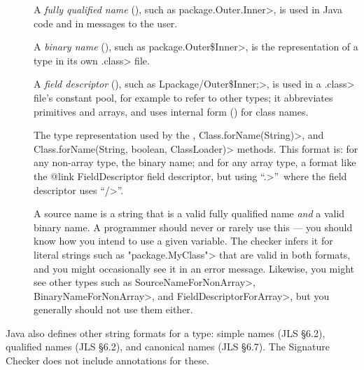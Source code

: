 \begin{description}

\item[]
  A \emph{fully qualified name} (), such as
  \<package.Outer.Inner>, is used in Java code and in messages to
  the user.

\item[]
  A \emph{binary name} (), such as
  \<package.Outer\$Inner>, is
  the representation of a type in its own \<.class> file.

\item[]
  A \emph{field descriptor} (), such as
  \<Lpackage/Outer\$Inner;>, is used in a \<.class> file's constant pool,
  for example to refer to other types; it abbreviates primitives and
  arrays, and uses internal form () for class names.

\item[]
  The type representation used by the
  , \<Class.forName(String)>,
  and \<Class.forName(String, boolean, ClassLoader)> methods.  This format
  is:  for any non-array type, the binary name; and for any array type, a
  format like the {@link FieldDescriptor field descriptor}, but using
  ``\<.>''~where the field descriptor uses ``\</>''.

\item[]
  A source name is a string that is a valid fully qualified name \emph{and}
  a valid binary name.  A programmer should never or rarely use this --- you should
  know how you intend to use a given variable.  The checker infers it for
  literal strings such as \<"package.MyClass"> that are valid in both
  formats, and you might occasionally see it in an error message.
  Likewise, you might see other types such as \<SourceNameForNonArray>,
  \<BinaryNameForNonArray>, and \<FieldDescriptorForArray>, but you
  generally should not use them either.

\end{description}

Java also defines other string formats for a type: simple
names (JLS \S 6.2), qualified names (JLS \S 6.2), and canonical
names (JLS \S 6.7).  The Signature Checker does not include annotations
for these.

